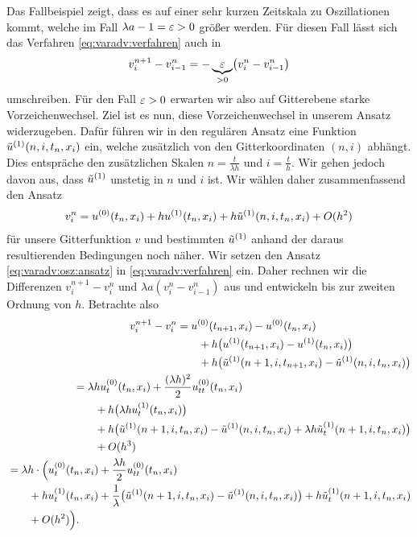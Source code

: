 Das Fallbeispiel zeigt, dass es auf einer sehr kurzen Zeitskala zu Oszillationen kommt, welche im Fall $\lambda a - 1 = \varepsilon > 0$ größer werden.
Für diesen Fall lässt sich das Verfahren \eqref{eq:varadv:verfahren} auch in
\begin{align}
v^{n+1}_i - v^n_{i-1} = - \underbrace{\varepsilon}_{> 0} \bigl( v^n_i - v^n_{i-1} \bigr)
\end{align}
umschreiben.
Für den Fall $\varepsilon > 0$ erwarten wir also auf Gitterebene starke Vorzeichenwechsel.
Ziel ist es nun, diese Vorzeichenwechsel in unserem Ansatz widerzugeben.
Dafür führen wir in den regulären Ansatz eine Funktion $\tilde u^{(1)}(n, i, t_n, x_i)$ ein, welche zusätzlich von den Gitterkoordinaten $(n,i)$ abhängt.
Dies entspräche den zusätzlichen Skalen $n = \frac t {\lambda h}$ und $i = \frac t h$.
Wir gehen jedoch davon aus, dass $\tilde u^{(1)}$ unstetig in $n$ und $i$ ist.
Wir wählen daher zusammenfassend den Ansatz
\begin{align}\label{eq:varadv:osz:ansatz}
v^n_i = u^{(0)}(t_n, x_i) + h u^{(1)}(t_n, x_i) + h \tilde u^{(1)}(n, i, t_n, x_i) + O(h^2)
\end{align}
für unsere Gitterfunktion $v$ und bestimmten $\tilde u^{(1)}$ anhand der daraus resultierenden Bedingungen noch näher.
Wir setzen den Ansatz \eqref{eq:varadv:osz:ansatz} in \eqref{eq:varadv:verfahren} ein.
Daher rechnen wir die Differenzen $v^{n+1}_i - v^n_i$ und $\lambda a (v^n_i - v^n_{i-1})$ aus und entwickeln bis zur zweiten Ordnung von $h$.
Betrachte also
{\small
\begin{align*}
\begin{split}
v^{n+1}_i - v^n_i &= u^{(0)}(t_{n+1}, x_i) - u^{(0)}(t_n, x_i)\\
&\qquad + h \bigl( u^{(1)}(t_{n+1}, x_i) - u^{(1)}(t_n, x_i) \bigr)\\
&\qquad + h \bigl( \tilde u^{(1)}(n+1, i, t_{n+1}, x_i) - \tilde u^{(1)}(n, i, t_n, x_i) \bigr)
\end{split}\\
\begin{split}
&= \lambda h u^{(0)}_t(t_n, x_i) + \frac {(\lambda h)^2} 2 u^{(0)}_{tt}(t_n, x_i)\\
&\qquad + h \bigl( \lambda h u^{(1)}_t(t_n, x_i) \bigr)\\
&\qquad + h \bigl( \tilde u^{(1)}(n+1, i, t_n, x_i) - \tilde u^{(1)}(n, i, t_n, x_i) + \lambda h \tilde u^{(1)}_t(n+1, i, t_n, x_i) \bigr)\\
&\qquad + O(h^3)
\end{split}\\
\begin{split}
&= \lambda h \cdot \Bigl( u^{(0)}_t(t_n, x_i) + \frac {\lambda h} 2 u^{(0)}_{tt}(t_n, x_i)\\
&\qquad + h u^{(1)}_t(t_n, x_i) + \frac{1}{\lambda} \bigl( \tilde u^{(1)}(n+1, i, t_n, x_i) - \tilde u^{(1)}(n, i, t_n, x_i)  \bigr) + h \tilde u^{(1)}_t(n+1, i, t_n, x_i)\\
&\qquad + O(h^2) \Bigr).
\end{split}
\end{align*}
}
